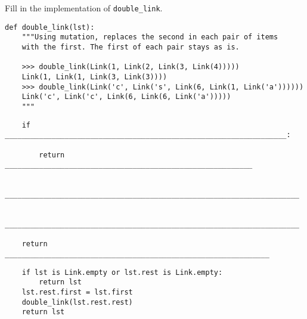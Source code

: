 \begin{blocksection}
\question Fill in the implementation of \lstinline$double_link$.

\begin{lstlisting}
def double_link(lst):
    """Using mutation, replaces the second in each pair of items
    with the first. The first of each pair stays as is.

    >>> double_link(Link(1, Link(2, Link(3, Link(4)))))
    Link(1, Link(1, Link(3, Link(3))))
    >>> double_link(Link('c', Link('s', Link(6, Link(1, Link('a'))))))
    Link('c', Link('c', Link(6, Link(6, Link('a')))))
    """
\end{lstlisting}

\ifprintanswers\else
\begin{lstlisting}
    if __________________________________________________________________:

        return __________________________________________________________

    _____________________________________________________________________

    _____________________________________________________________________

    return ______________________________________________________________
\end{lstlisting}
\fi

\begin{solution}
\begin{lstlisting}
    if lst is Link.empty or lst.rest is Link.empty:
        return lst
    lst.rest.first = lst.first
    double_link(lst.rest.rest)
    return lst
\end{lstlisting}
\end{solution}
\end{blocksection}
